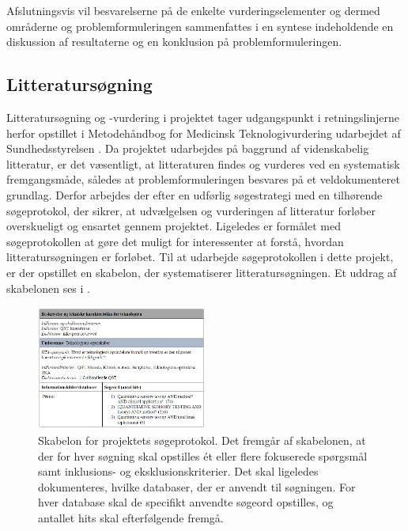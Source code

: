 Afslutningsvis vil besvarelserne på de enkelte vurderingselementer og dermed områderne og problemformuleringen sammenfattes i en syntese indeholdende en diskussion af resultaterne og en konklusion på problemformuleringen. 

\subsection{Litteratursøgning}
Litteratursøgning og -vurdering i projektet tager udgangspunkt i retningslinjerne herfor opstillet i Metodehåndbog for Medicinsk Teknologivurdering udarbejdet af Sundhedsstyrelsen \citep{1}. Da projektet udarbejdes på baggrund af videnskabelig litteratur, er det væsentligt, at litteraturen findes og vurderes ved en systematisk fremgangsmåde, således at problemformuleringen besvares på et veldokumenteret grundlag. Derfor arbejdes der efter en udførlig søgestrategi med en tilhørende søgeprotokol, der sikrer, at udvælgelsen og vurderingen af litteratur forløber overskueligt og ensartet gennem projektet. Ligeledes er formålet med søgeprotokollen at gøre det muligt for interessenter at forstå, hvordan litteratursøgningen er forløbet. \citep{metodehaandbogen}
Til at udarbejde søgeprotokollen i dette projekt, er der opstillet en skabelon, der systematiserer litteratursøgningen. Et uddrag af skabelonen ses i . 

\begin{figure}[H] 
\begin{center}
\includegraphics[width=0.5\textwidth]{figures/cMetode/soegeprotokol}
\end{center}
\caption{Skabelon for projektets søgeprotokol. Det fremgår af skabelonen, at der for hver søgning skal opstilles ét eller flere fokuserede spørgsmål samt inklusions- og eksklusionskriterier. Det skal ligeledes dokumenteres, hvilke databaser, der er anvendt til søgningen. For hver database skal de specifikt anvendte søgeord opstilles, og antallet hits skal efterfølgende fremgå.} 
\label{fig:soegeprotokol} 
\end{figure}

